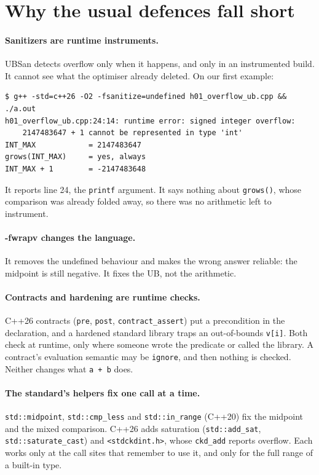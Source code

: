 \documentclass[11pt,a4paper]{article}
\newcommand{\code}[1]{\texttt{\small #1}}
\begin{document}
\section{Why the usual defences fall short}\label{sec:mitigations}

\paragraph{Sanitizers are runtime instruments.} UBSan detects overflow only
when it happens, and only in an instrumented build. It cannot see what the
optimiser already deleted. On our first example:

\begin{lstlisting}[style=term]
$ g++ -std=c++26 -O2 -fsanitize=undefined h01_overflow_ub.cpp && ./a.out
h01_overflow_ub.cpp:24:14: runtime error: signed integer overflow:
    2147483647 + 1 cannot be represented in type 'int'
INT_MAX            = 2147483647
grows(INT_MAX)     = yes, always
INT_MAX + 1        = -2147483648
\end{lstlisting}

\noindent
It reports line 24, the \code{printf} argument. It says nothing about
\code{grows()}, whose comparison was already folded away, so there was no
arithmetic left to instrument.

\paragraph{-fwrapv changes the language.} It removes the undefined
behaviour and makes the wrong answer reliable: the midpoint is still negative.
It fixes the UB, not the arithmetic.

\begin{sloppypar}
\paragraph{Contracts and hardening are runtime checks.} C++26 contracts
(\code{pre}, \code{post}, \code{contract\_assert}) put a precondition in the
declaration, and a hardened standard library traps an out-of-bounds
\code{v[i]}. Both check at runtime, only where someone wrote the predicate or
called the library. A contract's evaluation semantic may be \code{ignore}, and
then nothing is checked. Neither changes what \code{a + b} does.

\paragraph{The standard's helpers fix one call at a time.} \code{std::midpoint},
\code{std::cmp\_less} and \code{std::in\_range} (C++20) fix the midpoint and
the mixed comparison. C++26 adds saturation (\code{std::add\_sat},
\code{std::saturate\_cast}) and \code{<stdckdint.h>}, whose
\code{ckd\_add} reports overflow. Each works only at the call sites that
remember to use it, and only for the full range of a built-in type.
\end{sloppypar}
\end{document}
